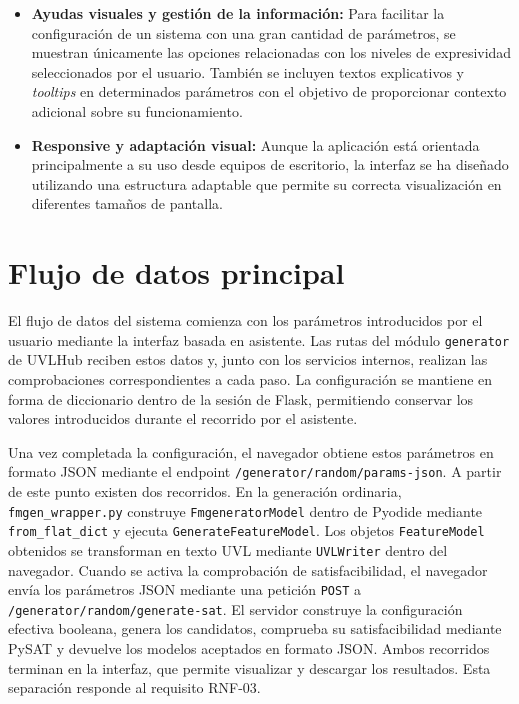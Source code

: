 \begin{itemize}
    \item \textbf{Ayudas visuales y gestión de la información:} Para facilitar la
    configuración de un sistema con una gran cantidad de parámetros, se muestran
    únicamente las opciones relacionadas con los niveles de expresividad seleccionados
    por el usuario. También se incluyen textos explicativos y \textit{tooltips}
    en determinados parámetros con el objetivo de proporcionar contexto adicional
    sobre su funcionamiento.

    \item \textbf{Responsive y adaptación visual:} Aunque la aplicación está orientada
    principalmente a su uso desde equipos de escritorio, la interfaz se ha diseñado
    utilizando una estructura adaptable que permite su correcta visualización en
    diferentes tamaños de pantalla.

\end{itemize}

\section{Flujo de datos principal}
\label{sec:flujo}


El flujo de datos del sistema comienza con los parámetros introducidos por el usuario mediante la interfaz basada en asistente. Las rutas del módulo \texttt{generator} de UVLHub reciben estos datos y, junto con los servicios internos, realizan las comprobaciones correspondientes a cada paso. La configuración se mantiene en forma de diccionario dentro de la sesión de Flask, permitiendo conservar los valores introducidos durante el recorrido por el asistente.

Una vez completada la configuración, el navegador obtiene estos parámetros en
formato JSON mediante el endpoint
\texttt{/generator/random/params-json}. A partir de este punto existen dos
recorridos. En la generación ordinaria, \texttt{fmgen\_wrapper.py} construye
\texttt{FmgeneratorModel} dentro de Pyodide mediante
\texttt{from\_flat\_dict} y ejecuta \texttt{GenerateFeatureModel}. Los objetos
\texttt{FeatureModel} obtenidos se transforman en texto UVL mediante
\texttt{UVLWriter} dentro del navegador. Cuando se activa la comprobación de
satisfacibilidad, el navegador envía los parámetros JSON mediante una petición
\texttt{POST} a \texttt{/generator/random/generate-sat}. El servidor construye
la configuración efectiva booleana, genera los candidatos, comprueba su
satisfacibilidad mediante PySAT y devuelve los modelos aceptados en formato
JSON. Ambos recorridos terminan en la interfaz, que permite visualizar y
descargar los resultados. Esta separación responde al requisito RNF-03.

